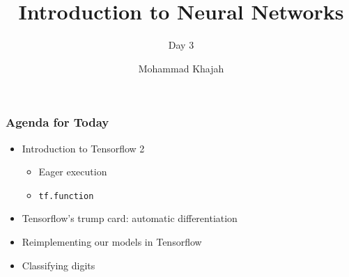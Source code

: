 \documentclass{beamer}
\title{Introduction to Neural Networks}
\subtitle{Day 3}
\author{Mohammad Khajah}
\institute[KISR]{Kuwait Institute for Scientific Research}
\date{}
\begin{document}
\begin{frame}
\titlepage
\end{frame}

\begin{frame}
\frametitle{Agenda for Today}

\begin{itemize}
\item Introduction to Tensorflow 2
\begin{itemize}
\item Eager execution
\item \texttt{tf.function}
\end{itemize}
\item Tensorflow's trump card: automatic differentiation
\item Reimplementing our models in Tensorflow
\item Classifying digits
\end{itemize}

\end{frame}
\end{document}
